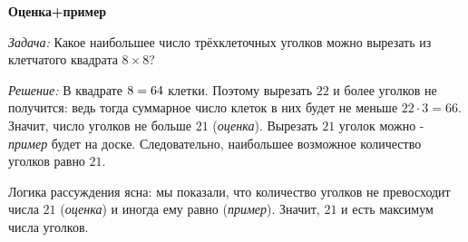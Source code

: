 \documentclass{article}
\begin{document}
\large


\begin{center}
\textbf{Оценка+пример}
\end{center}

\textit{Задача:} Какое наибольшее число трёхклеточных уголков можно вырезать из клетчатого квадрата $8 \times 8$?

\textit{Решение:} В квадрате $8 \time 8=64$ клетки. Поэтому вырезать $22$ и более уголков не получится: ведь тогда суммарное число клеток в них будет не меньше $22\cdot 3 = 66$. Значит, число уголков не больше $21$ (\textit{оценка}).
Вырезать $21$ уголок можно - \textit{пример} будет на доске. Следовательно, наибольшее возможное количество уголков равно $21$.

Логика рассуждения ясна: мы показали, что количество уголков не превосходит числа $21$
(\textit{оценка}) и иногда ему равно (\textit{пример}). Значит, $21$ и есть максимум числа уголков.
\end{document}
